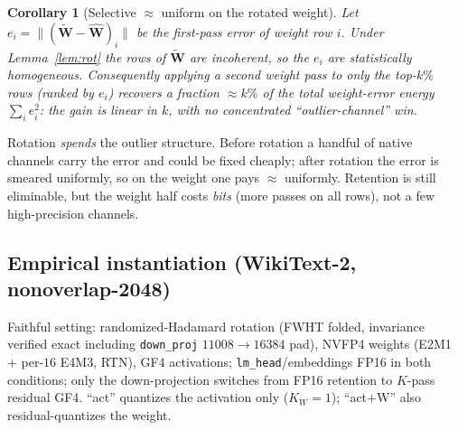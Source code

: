 \documentclass[11pt]{article}
\newtheorem{corollary}{Corollary}
\theoremstyle{remark}
\newcommand{\norm}[1]{\lVert #1 \rVert}
\newcommand{\Wt}{\tilde{\bm W}}
\begin{document}
\begin{corollary}[Selective $\approx$ uniform on the rotated weight]
\label{cor:sel}
Let $e_i=\norm{(\Wt-\hat{\bm W})_i}$ be the first-pass error of weight row $i$.
Under Lemma~\ref{lem:rot} the rows of $\Wt$ are incoherent, so the $e_i$ are
statistically homogeneous. Consequently applying a \emph{second} weight pass to
only the top-$k\%$ rows (ranked by $e_i$) recovers a fraction
$\approx k\%$ of the total weight-error energy $\sum_i e_i^2$: the gain is linear
in $k$, with no concentrated ``outlier-channel'' win.
\end{corollary}

Rotation \emph{spends} the outlier structure. Before rotation a handful of native
channels carry the error and could be fixed cheaply; after rotation the error is
smeared uniformly, so on the weight one pays $\approx$ uniformly. Retention is
still eliminable, but the weight half costs \emph{bits} (more passes on all rows),
not a few high-precision channels.

\subsection{Empirical instantiation (WikiText-2, nonoverlap-2048)}

Faithful setting: randomized-Hadamard rotation (FWHT folded, invariance verified
exact including \texttt{down\_proj} $11008\!\to\!16384$ pad), NVFP4 weights
(E2M1 + per-$16$ E4M3, RTN), GF4 activations; \texttt{lm\_head}/embeddings FP16
in both conditions; only the down-projection switches from FP16 retention to
$K$-pass residual GF4. ``act'' quantizes the activation only ($K_W{=}1$);
``act$+$W'' also residual-quantizes the weight.
\end{document}
